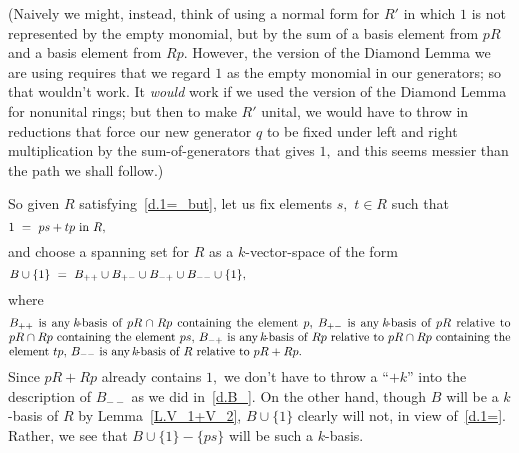 \documentclass{amsart}
\begin{document}
(Naively we might, instead, think of using a normal form for
$R'$ in which $1$ is not represented by the empty monomial, but by the
sum of a basis element from $pR$ and a basis element from $Rp.$
However, the version of the Diamond Lemma we are using requires that
we regard $1$ as the empty monomial in our generators;
so that wouldn't work.
It {\em would} work if we used the version of the Diamond Lemma for
nonunital rings; but then to make $R'$ unital, we would have
to throw in reductions that force our new generator $q$ to be fixed
under left and right
multiplication by the sum-of-generators that gives $1,$
and this seems messier than the path we shall follow.)

So given $R$ satisfying~\eqref{d.1=_but},
let us fix elements $s,$ $t\in R$ such that
\begin{equation}\begin{minipage}[c]{35pc}\label{d.1=}
$1\ =\ ps+tp$ in $R,$
\end{minipage}\end{equation}
and choose a spanning set for $R$ as a $\!k\!$-vector-space of the form
\begin{equation}\begin{minipage}[c]{35pc}\label{d.1=:B=}
$B\cup\{1\}\ =\ B_{++}\cup B_{+-} \cup B_{-+}\cup B_{--}\cup \{1\},$
\end{minipage}\end{equation}
where
\begin{equation}\begin{minipage}[c]{35pc}\label{d.1=:B_}
$B_{++}$ is any $\!k\!$-basis of $pR\cap Rp$ containing
the element $p,$

$B_{+-}$ is any $\!k\!$-basis of $pR$ relative to $pR\cap Rp$
containing the element $ps,$

$B_{-+}$ is any $\!k\!$-basis of $Rp$ relative to $pR\cap Rp$
containing the element $tp,$

$B_{--}$ is any $\!k\!$-basis of $R$ relative to $pR+Rp.$
\end{minipage}\end{equation}
Since $pR+Rp$ already contains $1,$ we don't have to
throw a ``$+k$'' into the description of $B_{--}$
as we did in~\eqref{d.B_}.
On the other hand, though $B$ will be a $\!k\!$-basis
of $R$ by Lemma~\ref{L.V_1+V_2},
$B\cup\{1\}$ clearly will not, in view of~\eqref{d.1=}.
Rather, we see that $B\cup\{1\}-\{ps\}$ will be such a $\!k\!$-basis.
\end{document}
